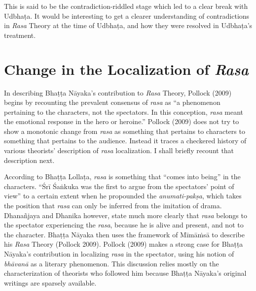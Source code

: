 This is said to be the contradiction-riddled stage which led to a clear break with Udbhaṭa. It would be interesting to get a clearer understanding of contradictions in \textsl{Rasa} Theory at the time of Udbhaṭa, and how they were resolved in Udbhaṭa’s treatment.\\[-21pt]

\section*{Change in the Localization of \textsl{Rasa}}

In describing Bhaṭṭa Nāyaka’s contribution to \textsl{Rasa} Theory, Pollock (2009) begins by recounting the prevalent consensus of \textsl{rasa} as “a phenomenon pertaining to the characters, not the spectators. In this conception, \textsl{rasa }meant the emotional response in the hero or heroine.” Pollock (2009) does not try to show a monotonic change from \textsl{rasa} as something that pertains to characters to something that pertains to the audience. Instead it traces a checkered history of various theorists’ description of \textsl{rasa} localization. I shall briefly recount that description next. 


According to Bhaṭṭa Lollaṭa, \textsl{rasa} is something that “comes into being” in the characters. “Śrī Śaṅkuka was the first to argue from the spectators’ point of view” to a certain extent when he propounded the \textsl{anumati-pakṣa}, which takes the position that \textsl{rasa} can only be inferred from the imitation of drama. Dhanañjaya and Dhanika however, state much more clearly that \textsl{rasa} belongs to the spectator experiencing the \textsl{rasa}, because he is alive and present, and not to the character. Bhaṭṭa Nāyaka then uses the framework of Mīmāṁsā to describe his \textsl{Rasa} Theory (Pollock 2009). Pollock (2009) makes a strong case for Bhaṭṭa Nāyaka’s contribution in localizing \textsl{rasa} in the spectator, using his notion of \textsl{bhāvanā} as a literary phenomenon. This discussion relies mostly on the characterization of theorists who followed him because Bhaṭṭa Nāyaka’s original writings are sparsely available. 

